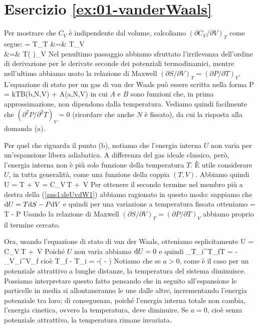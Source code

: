 %
%
\section*{Esercizio \ref{ex:01-vanderWaals}}

Per mostrare che $C_V$ è indipendente dal volume, calcoliamo $(\partial C_V/\partial V)_T$ come segue:
\bea
{} = T_T &=& T_V \nonumber \\
&=& T\left(
\right)_V
\eea
Nel penultimo passaggio abbiamo sfruttato l'irrilevanza dell'ordine di derivazione per le derivate seconde dei potenziali termodinamici, mentre nell'ultimo abbiamo usato la relazione di Maxwell 
$(\partial S/\partial V)_T = (\partial P/\partial T)_V$. L'equazione di stato per un gas di van der Waals può essere scritta nella forma
\be
P = kTB(b,N,V) + A(a,N,V)
\ee
in cui $A$ e $B$ sono funzioni che, in prima approssimazione, non dipendono dalla temperatura. Vediamo quindi facilmente che $(\partial^2 P/\partial^2 T)_V = 0$ (ricordare che anche $N$ è fissato), da cui la risposta alla domanda (a).

Per quel che riguarda il punto (b), notiamo che l'energia interna $U$ non varia per un'espansione libera adiabatica. A differenza del gas ideale classico, però, l'energia interna non è più solo funzione della temperatura $T$. È utile considerare $U$, in tutta generalità, come una funzione della coppia $(T,V)$. Abbiamo quindi
\be
\label{ans1:deUvdW1}
\de U = \de T + \de V =
C_V\,\de T + \,\de V
\ee
Per ottenere il secondo termine nel membro più a destra della (\ref{ans1:deUvdW1}) abbiamo ragionato in questo modo: sappiamo che ${\textrm d}U = T{\textrm d}S - P{\textrm d}V$ e quindi per una variazione a temperatura fissata otteniamo
\be
{} = T - P
\ee
Usando la relazione di Maxwell $(\partial S/\partial V)_T = (\partial P/\partial T)_V$ abbiamo proprio il termine cercato.

Ora, usando l'equazione di stato di van der Waals, otteniamo esplicitamente
\be
\de U = C_V\,\de T + \,\de V
\ee
Poiché $U$ non varia abbiamo ${\textrm d}U = 0$ e quindi
\be
\int_{T_i}^{T_f}\de T = -\int_{V_i}^{V_f}
\ee
cioè
\be
T_f - T_i = -\left(
 - 
\right)
\ee
Notiamo che se $a > 0$, come è il caso per un potenziale attrattivo a lunghe distanze, la temperatura del sistema diminuisce. Possiamo interpretare questo fatto pensando che in seguito all'espansione le particelle in media si allontaneranno le une dalle altre, incrementando l'energia potenziale tra loro; di conseguenza, poiché l'energia interna totale non cambia, l'energia cinetica, ovvero la temperatura, deve diminuire. Se $a = 0$, cioè senza potenziale attrattivo, la temperatura rimane invariata.

